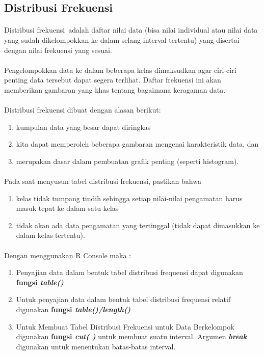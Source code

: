 \documentclass[a4paper,12pt]{article}
\begin{document}
\subsection{Distribusi Frekuensi}
\paragraph{}
Distribusi frekuensi adalah daftar nilai data (bisa nilai individual atau nilai data yang sudah dikelompokkan ke dalam selang interval tertentu) yang disertai dengan nilai frekuensi yang sesuai.
\paragraph{}
Pengelompokkan data ke dalam beberapa kelas dimaksudkan agar ciri-ciri penting data tersebut dapat segera terlihat. Daftar frekuensi ini akan memberikan gambaran yang khas tentang bagaimana keragaman data.
\paragraph{}
Distribusi frekuensi dibuat dengan alasan berikut:
\begin{enumerate}[label=\alph*.]
	\item kumpulan data yang besar dapat diringkas
	\item kita dapat memperoleh beberapa gambaran mengenai karakteristik data, dan
	\item merupakan dasar dalam pembuatan grafik penting (seperti histogram).
\end{enumerate}
\paragraph{}
Pada saat menyusun tabel distribusi frekuensi, pastikan bahwa 
\begin{enumerate}[label=\alph*.]
	\item kelas tidak tumpang tindih sehingga setiap nilai-nilai pengamatan harus masuk tepat ke dalam satu kelas
	\item tidak akan ada data pengamatan yang tertinggal (tidak dapat dimasukkan ke dalam kelas tertentu). 
\end{enumerate}
\paragraph{}
Dengan menggunakan R Console maka :
\begin{enumerate}
	\item Penyajian data dalam bentuk tabel  distribusi frequensi dapat digunakan \textbf{fungsi \textit{table()}}
	\item Untuk  penyajian data dalam bentuk tabel  distribusi frequensi relatif  digunakan \textbf{fungsi \textit{table()/length()}}
	\item Untuk Membuat Tabel Distribusi Frekuensi untuk Data Berkelompok digunakan \textbf{fungsi \textit{cut( )}} untuk membuat suatu interval. Argumen \textbf{\textit{break}} digunakan untuk menentukan batas-batas interval.	
\end{enumerate}
\end{document}
